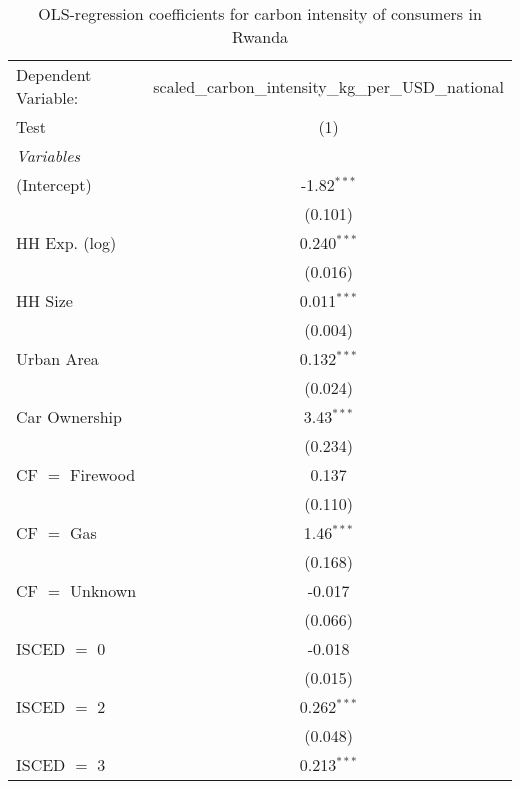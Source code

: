 
\begin{table}[htbp!]
   \centering
   \small
   \begin{adjustbox}{width = 1\textwidth, max height = 0.95\textheight, center}
      \begin{threeparttable}[b]
         \caption{\label{tab:OLS_1_RWA} OLS-regression coefficients for carbon intensity of consumers in Rwanda}
         \begin{tabular}{lc}
            \tabularnewline \midrule \midrule
            Dependent Variable: & scaled\_carbon\_intensity\_kg\_per\_USD\_national\\        
            Test                & (1)\\  
            \midrule
            \emph{Variables}\\
            (Intercept)         & -1.82$^{***}$\\   
                                & (0.101)\\   
            HH Exp. (log)       & 0.240$^{***}$\\   
                                & (0.016)\\   
            HH Size             & 0.011$^{***}$\\   
                                & (0.004)\\   
            Urban Area          & 0.132$^{***}$\\   
                                & (0.024)\\   
            Car Ownership       & 3.43$^{***}$\\   
                                & (0.234)\\   
            CF $=$ Firewood     & 0.137\\   
                                & (0.110)\\   
            CF $=$ Gas          & 1.46$^{***}$\\   
                                & (0.168)\\   
            CF $=$ Unknown      & -0.017\\   
                                & (0.066)\\   
            ISCED $=$ 0         & -0.018\\   
                                & (0.015)\\   
            ISCED $=$ 2         & 0.262$^{***}$\\   
                                & (0.048)\\   
            ISCED $=$ 3         & 0.213$^{***}$\\   

\end{tabular}
\end{threeparttable}
\end{adjustbox}
\end{table}
